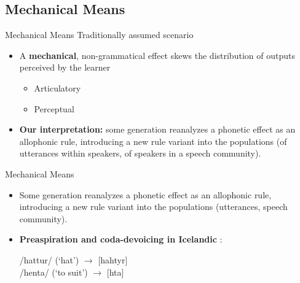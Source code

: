 \documentclass[hyperref={pdfpagelabels=false}]{beamer}
\begin{document}
\subsection{Mechanical Means}
\begin{frame}{Mechanical Means}
	Traditionally assumed scenario \citep{Ohala1981} \\
	\begin{itemize}
		\item A \textbf{mechanical}, non-grammatical effect skews the distribution of outputs perceived by the learner 
		\begin{itemize} \pause
			\item Articulatory \pause
			\item Perceptual \pause
		\end{itemize}
		\item \textbf{Our interpretation:} some generation reanalyzes a phonetic effect as an allophonic rule, introducing a new rule variant into the populations (of utterances within speakers, of speakers in a speech community).
	\end{itemize}



\end{frame}

\begin{frame}{Mechanical Means}
	\begin{itemize}
		\item Some generation reanalyzes a phonetic effect as an allophonic rule, introducing a new rule variant into the populations (utterances, speech community).
		\item \textbf{Preaspiration and coda-devoicing in Icelandic} \citep[][]{kristjan1980, kristjan1986}: \\
		\begin{center}
		/hattur/ (`hat') $\rightarrow$ [hahtyr]\\ /henta/ (`to suit') $\rightarrow$ [h\textepsilon{}ta]
		\end{center}
	\end{itemize}

\end{frame}
\end{document}

